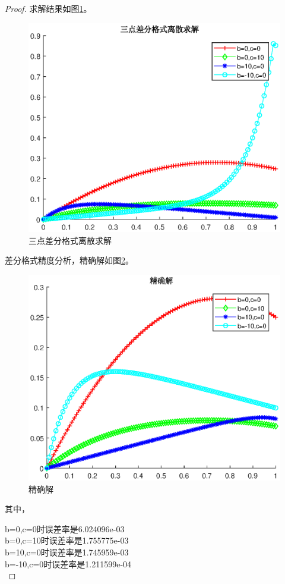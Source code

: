 \documentclass{article}%
\begin{document}
\begin{proof}

求解结果如图\ref{Fig:1.1}。

\begin{figure}[H]
	\includegraphics[width=1\linewidth]{week9_1_1.eps}
	\caption{三点差分格式离散求解}
	\label{Fig:1.1}
\end{figure}

差分格式精度分析，精确解如图\ref{Fig:1.2}。

\begin{figure}[H]
	\includegraphics[width=1\linewidth]{week9_1_2.eps}
	\caption{精确解}
	\label{Fig:1.2}
\end{figure}

其中，

\noindent b=0,c=0时误差率是6.024096e-03\\
	b=0,c=10时误差率是1.755775e-03\\
	b=10,c=0时误差率是1.745959e-03\\
	b=-10,c=0时误差率是1.211599e-04\\


\end{proof}
\end{document}
